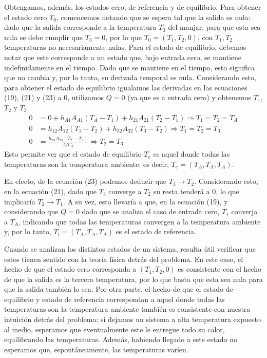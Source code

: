 \documentclass[
  11pt,
  letterpaper,
   addpoints,
   answers
  ]{exam}
\begin{document}
\begin{questions}
\begin{solution}
Obtengamos, además, los estados cero, de referencia y de equilibrio. Para obtener el estado cero $T_0$, comencemos notando que se espera tal que la salida es nula: dado que la salida corresponde a la temperatura $T_3$ del manjar, para que esta sea nula se debe cumplir que $T_3 = 0$, por lo que $T_0 = (T_1, T_2, 0)$, con $T_1, T_2$ temperaturas no necesariamente nulas.
Para el estado de equilibrio, debemos notar que este corresponde a un estado que, bajo entrada cero, se mantiene indefinidamente en el tiempo. Dado que se mantiene en el tiempo, esto significa que no cambia y, por lo tanto, su derivada temporal es nula. Considerando esto, para obtener el estado de equilibrio igualamos las derivadas en las ecuaciones (19), (21) y (23) a 0, utilizamos $Q = 0$ (ya que es a entrada cero) y obtenemos $T_1$, $T_2$ y $T_3$.
\begin{align}
    0 &= 0 + h_{A1}A_{A1} (T_A - T_1) + h_{21}A_{21} (T_2 - T_1) \Rightarrow T_1 = T_2 = T_A \tag{24} \\
    0 &= h_{12}A_{12} (T_1 - T_2) + h_{32}A_{32} (T_3 - T_2) \Rightarrow T_1 = T_2 = T_3 \tag{25} \\
    0 &= \frac{h_{23}A_{23} (T_2 - T_3)}{MC_3} \Rightarrow T_2 = T_3 \tag{26}
\end{align}
Esto permite ver que el estado de equilibrio $T_e$ es aquel donde todas las temperaturas son la temperatura ambiente: es decir, $T_e = (T_A, T_A, T_A)$.

En efecto, de la ecuación (23) podemos deducir que $T_3 \rightarrow T_2$. Considerando esto, en la ecuación (21), dado que $T_3$ converge a $T_2$ su resta tenderá a 0, lo que implicaría $T_2 \rightarrow T_1$. A su vez, esto llevaría a que, en la ecuación (19), y considerando que $Q = 0$ dado que se analiza el caso de entrada cero, $T_1$ converja a $T_A$, indicando que todas las temperaturas convergen a la temperatura ambiente y, por lo tanto, $T_l = (T_A, T_A, T_A)$ es el estado de referencia.

Cuando se analizan los distintos estados de un sistema, resulta útil verificar que estos tienen sentido con la teoría física detrás del problema. En este caso, el hecho de que el estado cero corresponda a $(T_1, T_2, 0)$ es consistente con el hecho de que la salida es la tercera temperatura, por lo que basta que esta sea nula para que la salida también lo sea. Por otra parte, el hecho de que el estado de equilibrio y estado de referencia correspondan a aquel donde todas las temperaturas son la temperatura ambiente también es consistente con nuestra intuición detrás del problema: si dejamos un sistema a alta temperatura expuesto al medio, esperamos que eventualmente este le entregue todo su calor, equilibrando las temperaturas. Además, habiendo llegado a este estado no esperamos que, espontáneamente, las temperaturas varíen.

\end{solution}
\end{questions}
\end{document}
